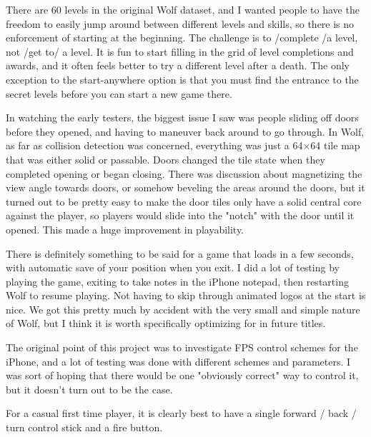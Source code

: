 There are 60 levels in the original Wolf dataset, and I wanted people to have the freedom to easily jump around between different levels and skills, so there is no enforcement of starting at the beginning.  The challenge is to /complete /a level, not /get to/ a level.  It is fun to start filling in the grid of level completions and awards, and it often feels better to try a different level after a death.  The only exception to the start-anywhere option is that you must find the entrance to the secret levels before you can start a new game there.\\
\par

In watching the early testers, the biggest issue I saw was people sliding off doors before they opened, and having to maneuver back around to go through.  In Wolf, as far as collision detection was concerned, everything was just a 64×64 tile map that was either solid or passable.
Doors changed the tile state when they completed opening or began closing.  There was discussion about magnetizing the view angle towards doors, or somehow beveling the areas around the doors, but it turned out to be pretty easy to make the door tiles only have a solid central core against the player, so players would slide into the "notch" with the door until it opened.  This made a huge improvement in playability.\\
\par

There is definitely something to be said for a game that loads in a few seconds, with automatic save of your position when you exit.  I did a lot of testing by playing the game, exiting to take notes in the iPhone notepad, then restarting Wolf to resume playing.  Not having to skip through animated logos at the start is nice.  We got this pretty much by accident with the very small and simple nature of Wolf, but I think it is worth specifically optimizing for in future titles.\\
\par

The original point of this project was to investigate FPS control schemes for the iPhone, and a lot of testing was done with different schemes and parameters.  I was sort of hoping that there would be one "obviously correct" way to control it, but it doesn't turn out to be the case.\\
\par

For a casual first time player, it is clearly best to have a single forward / back / turn control stick and a fire button.\\
\par

